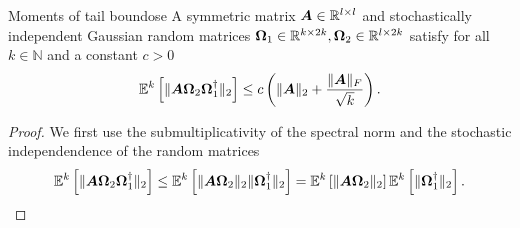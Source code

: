 \documentclass[12pt]{article}
\begin{document}
\begin{lemma}{Moments of tail bound}{ose}
    A symmetric matrix $\boldsymbol{A} \in \mathbb{R}^{l \times l}$ and stochastically independent Gaussian random matrices $\boldsymbol{\Omega}_1 \in \mathbb{R}^{k \times 2k}, \boldsymbol{\Omega}_2 \in \mathbb{R}^{l \times 2k}$ satisfy for all $k \in \mathbb{N}$ and a constant $c > 0$
    \begin{equation}
        \mathbb{E}^{k}\left[ \lVert \boldsymbol{A} \boldsymbol{\Omega}_2 \boldsymbol{\Omega}_1^{\dagger} \rVert _2 \right] \leq c \left( \lVert \boldsymbol{A} \rVert _2 + \frac{\lVert \boldsymbol{A} \rVert _F}{\sqrt{k}} \right).
    \end{equation}
\end{lemma}

\begin{proof}
    We first use the submultiplicativity of the spectral norm and the stochastic independendence of the random matrices
    \begin{equation}
        \mathbb{E}^{k}\left[ \lVert \boldsymbol{A} \boldsymbol{\Omega}_2 \boldsymbol{\Omega}_1^{\dagger} \rVert _2 \right]
        \leq \mathbb{E}^{k}\left[ \lVert \boldsymbol{A} \boldsymbol{\Omega}_2 \rVert _2 \lVert \boldsymbol{\Omega}_1^{\dagger} \rVert _2 \right]
        = \mathbb{E}^{k}\left[ \lVert \boldsymbol{A} \boldsymbol{\Omega}_2 \rVert _2 \right] \mathbb{E}^{k}\left[  \lVert \boldsymbol{\Omega}_1^{\dagger} \rVert _2 \right].
        \label{equ:OSE-moment-bound-initial}
    \end{equation}


\end{proof}
\end{document}
